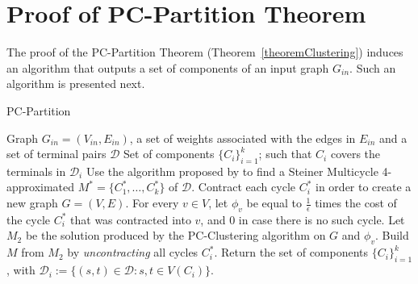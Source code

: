 \section{Proof of PC-Partition Theorem}

The proof of the PC-Partition Theorem (Theorem~\ref{theoremClustering}) induces an algorithm that outputs a set of components of an input graph \(G_{in}\). Such an algorithm is presented next.

\begin{algorithm}[H]
\caption{PC-Partition}
\label{algorithm:pc-partition}
\begin{algorithmic}[1]

\Require Graph \(G_{in} = (V_{in}, E_{in})\), a set of weights associated with the edges in \(E_{in}\) and a set of terminal pairs \(\mathcal{D}\)
\Ensure Set of components \(\{C_i\}_{i=1}^k\); such that \(C_i\) covers the terminals in \(\mathcal{D}_i\)
\State Use the algorithm proposed by \cite{Pereira2018TheSM} to find a Steiner Multicycle 4-approximated \(M^\ast = \{C^\ast_1, \dots, C^\ast_k\}\) of \(\mathcal{D}\).
\State Contract each cycle \(C_i^\ast\) in order to create a new graph \(G = (V, E)\).
\State For every \(v \in V\), let \(\phi_v\) be equal to \(\frac{1}{\epsilon}\) times the cost of the cycle \(C_i^\ast\) that was contracted into \(v\), and \(0\) in case there is no such cycle.
\State Let \(M_2\) be the solution produced by the PC-Clustering algorithm on \(G\) and \(\phi_v\).
\State Build \(M\) from \(M_2\) by \emph{uncontracting} all cycles \(C_i^\ast\).
\State Return the set of components \(\{C_i\}_{i=1}^k\), with \(\mathcal{D}_i := \{(s, t) \in \mathcal{D}: s, t \in V(C_i)\}\).

\end{algorithmic}
\end{algorithm}

